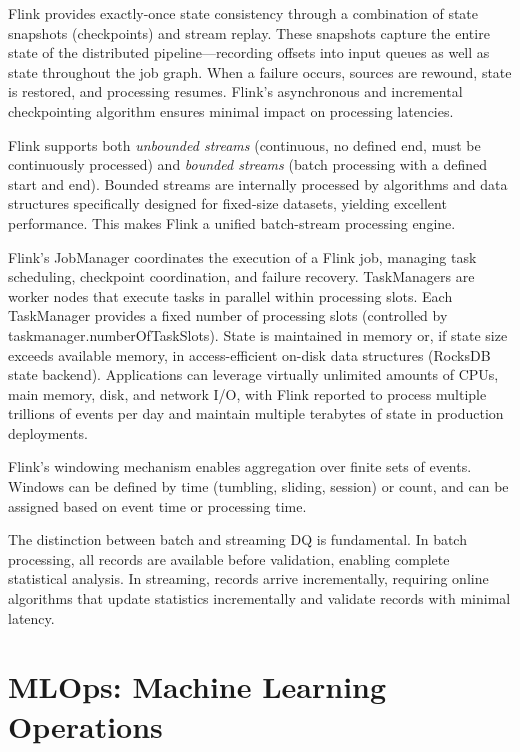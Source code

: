 Flink provides exactly-once state consistency through a combination of state snapshots (checkpoints) and stream replay. These snapshots capture the entire state of the distributed pipeline---recording offsets into input queues as well as state throughout the job graph. When a failure occurs, sources are rewound, state is restored, and processing resumes. Flink's asynchronous and incremental checkpointing algorithm ensures minimal impact on processing latencies.

Flink supports both \textit{unbounded streams} (continuous, no defined end, must be continuously processed) and \textit{bounded streams} (batch processing with a defined start and end). Bounded streams are internally processed by algorithms and data structures specifically designed for fixed-size datasets, yielding excellent performance. This makes Flink a unified batch-stream processing engine.

Flink's JobManager coordinates the execution of a Flink job, managing task scheduling, checkpoint coordination, and failure recovery. TaskManagers are worker nodes that execute tasks in parallel within processing slots. Each TaskManager provides a fixed number of processing slots (controlled by taskmanager.numberOfTaskSlots). State is maintained in memory or, if state size exceeds available memory, in access-efficient on-disk data structures (RocksDB state backend). Applications can leverage virtually unlimited amounts of CPUs, main memory, disk, and network I/O, with Flink reported to process multiple trillions of events per day and maintain multiple terabytes of state in production deployments.

Flink's windowing mechanism enables aggregation over finite sets of events. Windows can be defined by time (tumbling, sliding, session) or count, and can be assigned based on event time or processing time.

The distinction between batch and streaming DQ is fundamental. In batch processing, all records are available before validation, enabling complete statistical analysis. In streaming, records arrive incrementally, requiring online algorithms that update statistics incrementally and validate records with minimal latency.


\section{MLOps: Machine Learning Operations}

